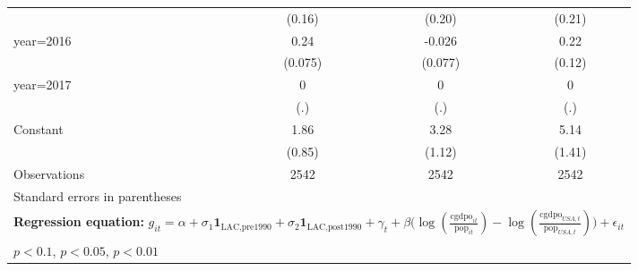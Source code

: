 \begin{sidewaystable}[htbp]
\begin{tabular}{l*{3}{c}}
                &   (0.16)         &   (0.20)         &   (0.21)         \\
\addlinespace
year=2016       &     0.24\sym{***}&   -0.026         &     0.22\sym{*}  \\
                &  (0.075)         &  (0.077)         &   (0.12)         \\
\addlinespace
year=2017       &        0         &        0         &        0         \\
                &      (.)         &      (.)         &      (.)         \\
\addlinespace
Constant        &     1.86\sym{**} &     3.28\sym{***}&     5.14\sym{***}\\
                &   (0.85)         &   (1.12)         &   (1.41)         \\
\midrule
Observations    &     2542         &     2542         &     2542         \\
\bottomrule
\multicolumn{4}{l}{\footnotesize Standard errors in parentheses}\\
\multicolumn{4}{l}{\footnotesize \textbf{Regression equation:} \(g_{it} = \alpha + \sigma_1 \mathbf{1}_{\textrm{LAC,pre1990}} + \sigma_2 \mathbf{1}_{\textrm{LAC,post1990}} + \gamma_t + \beta \big(\log (\frac{\textrm{cgdpo}_{it}}{\textrm{pop}_{it}} ) - \log (\frac{\textrm{cgdpo}_{USA,t}}{\textrm{pop}_{USA,t}}  ) \big) + \epsilon_{it}\)}\\
\multicolumn{4}{l}{\footnotesize \sym{*} \(p<0.1\), \sym{**} \(p<0.05\), \sym{***} \(p<0.01\)}\\
\end{tabular}
\end{sidewaystable}
